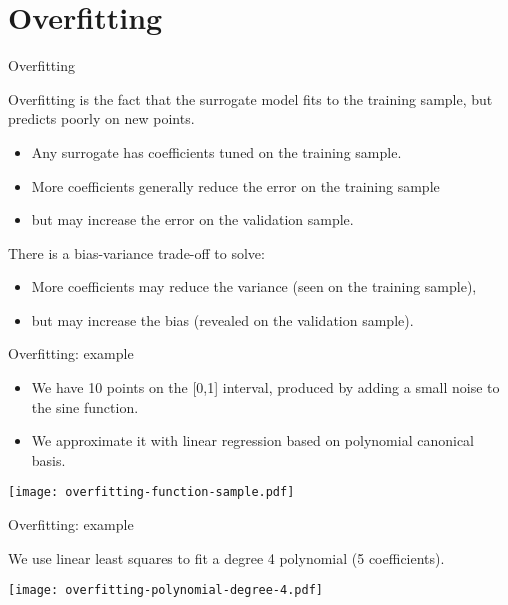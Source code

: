 \documentclass{beamer}
\begin{document}
\section{Overfitting}

\begin{frame}[t]{Overfitting}

Overfitting is the fact that the surrogate model fits to the 
training sample, but predicts poorly on new points. 

\begin{itemize}
\item Any surrogate has coefficients tuned on the training sample.
\item More coefficients generally reduce the error on the training sample 
\item but may increase the error on the validation sample.
\end{itemize}

There is a bias-variance trade-off to solve:
\begin{itemize}
\item More coefficients may reduce the variance (seen on the training sample), 
\item but may increase the bias (revealed on the validation sample).
\end{itemize}

\end{frame}
%

\begin{frame}[t]{Overfitting: example}

\begin{example}
\begin{itemize}
\item We have 10 points on the [0,1] interval, produced by 
adding a small noise to the sine function. 
\item We approximate it with linear regression based on polynomial 
canonical basis.
\end{itemize}
\end{example}

\begin{center}
 \texttt{[image: overfitting-function-sample.pdf]}
\end{center}

\end{frame}


\begin{frame}[t]{Overfitting: example}

We use linear least squares to fit a degree 4 polynomial (5 coefficients).

\begin{center}
 \texttt{[image: overfitting-polynomial-degree-4.pdf]}
\end{center}

\end{frame}
\end{document}
